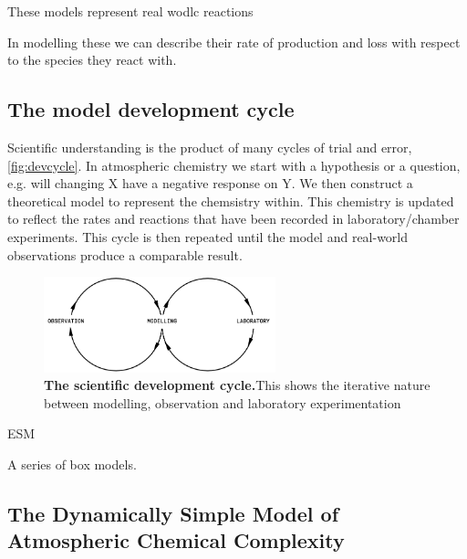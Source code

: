 These models represent real wodlc reactions 


In modelling these we can describe their rate of production and loss with respect to the species they react with. 



\subsection{The model development cycle}
Scientific understanding is the product of many cycles of trial and error, \autoref{fig:devcycle}. In atmospheric chemistry we start with a hypothesis or a question, e.g. will changing X have a negative response on Y. We then construct a theoretical model to represent the chemsistry within. This chemistry is updated to reflect the rates and reactions that have been recorded in laboratory/chamber experiments. This cycle is then repeated until the model and real-world observations produce a comparable result. 

\begin{figure}[H]
    \centering
    \includegraphics[width=0.6\textwidth]{devcycle.png}
    \caption{\textbf{The scientific development cycle.}This shows the iterative nature between modelling, observation and laboratory experimentation}
    \label{fig:devcycle}
\end{figure}






ESM 

 A series of box models.
 
 
 \subsection{The Dynamically Simple Model of Atmospheric Chemical Complexity}
 
 





